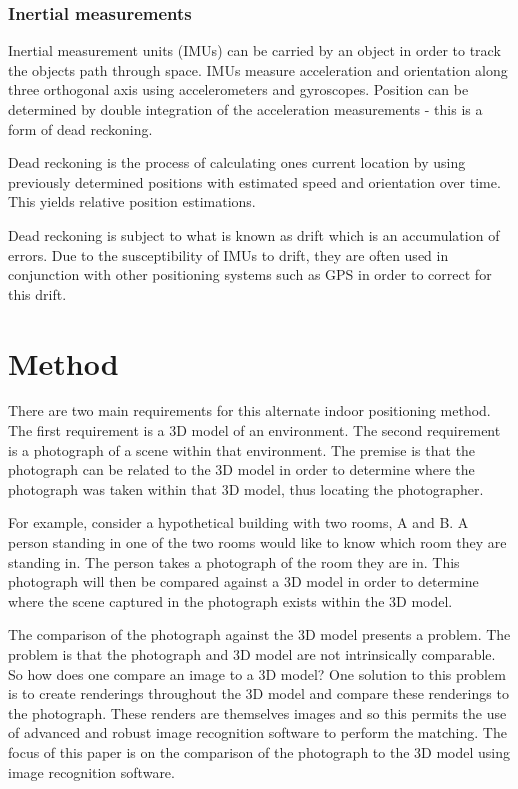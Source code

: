 \documentclass[11pt,a4paper]{report}
\begin{document}
	\subsection{Inertial measurements}
		Inertial measurement units (IMUs) can be carried by an object in order to track the objects path through space. IMUs measure acceleration and orientation along three orthogonal axis using accelerometers and gyroscopes. Position can be determined by double integration of the acceleration measurements - this is a form of dead reckoning.
		
		Dead reckoning is the process of calculating ones current location by using previously determined positions with estimated speed and orientation over time. This yields relative position estimations. 
		
		Dead reckoning is subject to what is known as drift which is an accumulation of errors. Due to the susceptibility of IMUs to drift, they are often used in conjunction with other positioning systems such as GPS in order to correct for this drift.

\newpage
\chapter{Method}
	There are two main requirements for this alternate indoor positioning method. The first requirement is a 3D model of an environment. The second requirement is a photograph of a scene within that environment. The premise is that the photograph can be related to the 3D model in order to determine where the photograph was taken within that 3D model, thus locating the photographer.
	
	For example, consider a hypothetical building with two rooms, A and B. A person standing in one of the two rooms would like to know which room they are standing in. The person takes a photograph of the room they are in. This photograph will then be compared against a 3D model in order to determine where the scene captured in the photograph exists within the 3D model.
	
	The comparison of the photograph against the 3D model presents a problem. The problem is that the photograph and  3D model are not intrinsically comparable. So how does one compare an image to a 3D model? One solution to this problem is to create renderings throughout the 3D model and compare these renderings to the photograph. These renders are themselves images and so this permits the use of advanced and robust image recognition software to perform the matching. The focus of this paper is on the comparison of the photograph to the 3D model using image recognition software.
	
\end{document}
